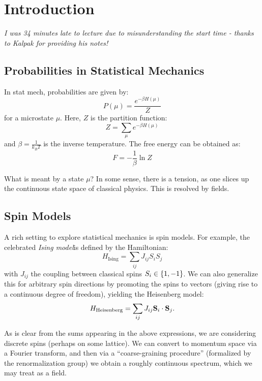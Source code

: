 \section{Introduction}
\emph{I was 34 minutes late to lecture due to misunderstanding the start time - thanks to Kalpak for providing his notes!}

\subsection{Probabilities in Statistical Mechanics}
In stat mech, probabilities are given by:
\begin{equation}
    P(\mu) = \frac{e^{-\beta H(\mu)}}{Z}
\end{equation}
for a microstate $\mu$. Here, $Z$ is the partition function:
\begin{equation}
    Z = \sum_\mu e^{-\beta H(\mu)}
\end{equation}
and $\beta = \frac{1}{k_B T}$ is the inverse temperature. The free energy can be obtained as:
\begin{equation}
    F = -\frac{1}{\beta}\ln Z
\end{equation}

What is meant by a state $\mu$? In some sense, there is a tension, as one slices up the continuous state space of classical physics. This is resolved by fields.

\subsection{Spin Models}
A rich setting to explore statistical mechanics is spin models. For example, the celebrated \emph{Ising model}is defined by the Hamiltonian:
\begin{equation}
    H_{\text{Ising}} = \sum_{ij}J_{ij}S_iS_j
\end{equation}
with $J_{ij}$ the coupling between classical spins $S_i \in \set{1, -1}$. We can also generalize this for arbitrary spin directions by promoting the spins to vectors (giving rise to a continuous degree of freedom), yielding the Heisenberg model:
\begin{equation}
    H_{\text{Heisenberg}} = \sum_{ij}J_{ij}\mathbf{S}_i \cdot \mathbf{S}_j.
\end{equation}

As is clear from the sums appearing in the above expressions, we are considering discrete spins (perhaps on some lattice). We can convert to momentum space via a Fourier transform, and then via a ``coarse-graining procedure'' (formalized by the renormalization group) we obtain a roughly continuous spectrum, which we may treat as a field.

